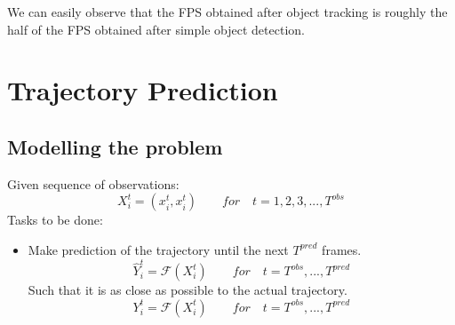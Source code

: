 \documentclass[conference]{IEEEtran}
\begin{document}
We can easily observe that the FPS obtained after object tracking is roughly the half of the FPS obtained after simple object detection.

\section{Trajectory Prediction}
\subsection{Modelling the problem}
Given sequence of observations:
\begin{equation*}
  X_i^t = (x_i^t,x_i^t ) \quad \quad for \quad t = 1,2,3,...,T^{obs}
\end{equation*}
Tasks to be done:
\begin{itemize}
  \item Make prediction of the trajectory until the next $T^{pred}$ frames.
        \begin{equation*}
          \hat{Y}_i^t = \mathcal{F}(X_i^{t}) \quad \quad for \quad t = T^{obs},...,T^{pred}
        \end{equation*}
        Such that it is as close as possible to the actual trajectory.
        \begin{equation*}
          Y_i^t = \mathcal{F}(X_i^{t}) \quad \quad for \quad t = T^{obs},...,T^{pred}
        \end{equation*}
\end{itemize}
\end{document}
